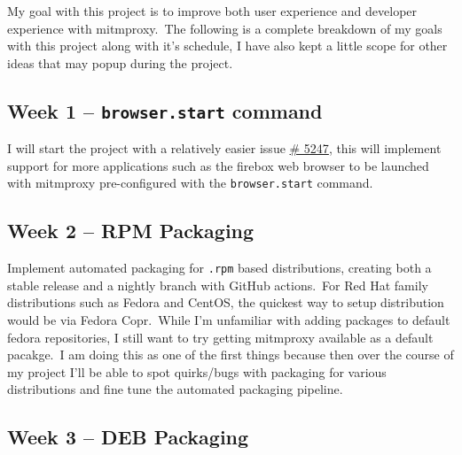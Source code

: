 
My goal with this project is to improve both user experience and developer experience with mitmproxy.\ The
following is a complete breakdown of my goals with this project along with it's schedule, I have also kept a little
scope for other ideas that may popup during the project.


\subsection{Week 1 -- \texttt{browser.start} command}
\label{subsec:week-1}

I will start the project with a relatively easier issue \href{https://github.com/mitmproxy/mitmproxy/issues/5247}{\#
5247},
this will implement support for more applications such as the firebox web browser to be launched with mitmproxy
pre-configured with the \texttt{browser.start} command.


\subsection{Week 2 -- RPM Packaging}
\label{subsec:week-2}

Implement automated packaging for \texttt{.rpm} based distributions, creating both a stable release and a nightly
branch with GitHub actions.\ For Red Hat family distributions such as Fedora and CentOS, the quickest way to setup
distribution would be via Fedora Copr.\ While I'm unfamiliar with adding packages to default fedora repositories,
I still want to try getting mitmproxy available as a default pacakge.\ I am doing this as one of the first things
because then over the course of my project I'll be able to spot quirks/bugs with packaging for various
distributions and fine tune the automated packaging pipeline.


\subsection{Week 3 -- DEB Packaging}
\label{subsec:week-3}

